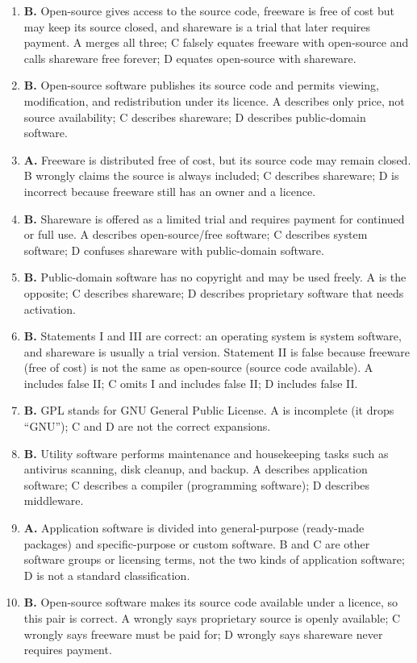 \begin{enumerate}[label=\textbf{Q\arabic*.}, leftmargin=*]
\item \textbf{B.} Open-source gives access to the source code, freeware is
  free of cost but may keep its source closed, and shareware is a trial that
  later requires payment. A merges all three; C falsely equates freeware with
  open-source and calls shareware free forever; D equates open-source with
  shareware.
\item \textbf{B.} Open-source software publishes its source code and permits
  viewing, modification, and redistribution under its licence. A describes
  only price, not source availability; C describes shareware; D describes
  public-domain software.
\item \textbf{A.} Freeware is distributed free of cost, but its source code
  may remain closed. B wrongly claims the source is always included; C
  describes shareware; D is incorrect because freeware still has an owner and
  a licence.
\item \textbf{B.} Shareware is offered as a limited trial and requires
  payment for continued or full use. A describes open-source/free software; C
  describes system software; D confuses shareware with public-domain
  software.
\item \textbf{B.} Public-domain software has no copyright and may be used
  freely. A is the opposite; C describes shareware; D describes proprietary
  software that needs activation.
\item \textbf{B.} Statements I and III are correct: an operating system is
  system software, and shareware is usually a trial version. Statement II is
  false because freeware (free of cost) is not the same as open-source
  (source code available). A includes false II; C omits I and includes false
  II; D includes false II.
\item \textbf{B.} GPL stands for GNU General Public License. A is incomplete
  (it drops ``GNU''); C and D are not the correct expansions.
\item \textbf{B.} Utility software performs maintenance and housekeeping
  tasks such as antivirus scanning, disk cleanup, and backup. A describes
  application software; C describes a compiler (programming software); D
  describes middleware.
\item \textbf{A.} Application software is divided into general-purpose
  (ready-made packages) and specific-purpose or custom software. B and C are
  other software groups or licensing terms, not the two kinds of application
  software; D is not a standard classification.
\item \textbf{B.} Open-source software makes its source code available under
  a licence, so this pair is correct. A wrongly says proprietary source is
  openly available; C wrongly says freeware must be paid for; D wrongly says
  shareware never requires payment.


\end{enumerate}
